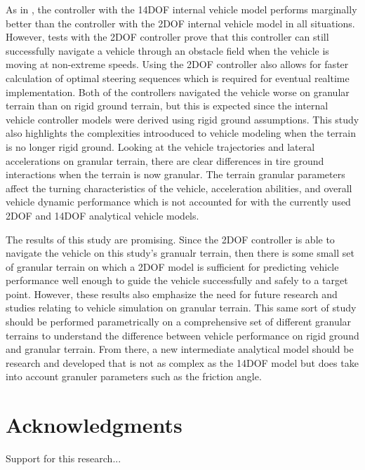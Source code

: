 \documentclass[12pt,twocolumn]{article}
\newcommand{\CHRONO}{{\sffamily{{Chrono}}}}
\begin{document}
As in \cite{ModelFidelity2016}, the controller with the 14DOF internal vehicle model performs marginally better than the controller with the 2DOF internal vehicle model in all situations. However, tests with the 2DOF controller prove that this controller can still successfully navigate a vehicle through an obstacle field when the vehicle is moving at non-extreme speeds. Using the 2DOF controller also allows for faster calculation of optimal steering sequences which is required for eventual realtime implementation. Both of the controllers navigated the vehicle worse on granular terrain than on rigid ground terrain, but this is expected since the internal vehicle controller models were derived using rigid ground assumptions. This study also highlights the complexities introoduced to vehicle modeling when the terrain is no longer rigid ground. Looking at the vehicle trajectories and lateral accelerations on granular terrain, there are clear differences in tire ground interactions when the terrain is now granular. The terrain granular parameters affect the turning characteristics of the vehicle, acceleration abilities, and overall vehicle dynamic performance which is not accounted for with the currently used 2DOF and 14DOF analytical vehicle models. 

The results of this study are promising. Since the 2DOF controller is able to navigate the {\CHRONO} vehicle on this study's granualr terrain, then there is some small set of granular terrain on which a 2DOF model is sufficient for predicting vehicle performance well enough to guide the vehicle successfully and safely to a target point. However, these results also emphasize the need for future research and studies relating to vehicle simulation on granular terrain. This same sort of study should be performed parametrically on a comprehensive set of different granular terrains to understand the difference between vehicle performance on rigid ground and granular terrain. From there, a new intermediate analytical model should be research and developed that is not as complex as the 14DOF model but does take into account granuler parameters such as the friction angle. 


\section*{Acknowledgments}
Support for this research...





\end{document}
